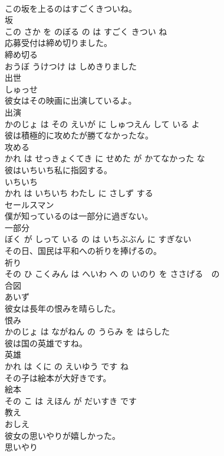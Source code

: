 \documentclass[8pt]{extreport}
\begin{document}
\begin{CJK}{UTF8}{min}
\\	この坂を上るのはすごくきついね。	
\\	坂 
\\	この さか を のぼる の は すごく きつい ね			
\\	応募受付は締め切りました。	
\\	締め切る 
\\	おうぼ うけつけ は しめきりました			
\\	出世	
\\	しゅっせ			
\\	彼女はその映画に出演しているよ。	
\\	出演 
\\	かのじょ は その えいが に しゅつえん して いる よ			
\\	彼は積極的に攻めたが勝てなかったな。	
\\	攻める 
\\	かれ は せっきょくてき に せめた が かてなかった な			
\\	彼はいちいち私に指図する。	
\\	いちいち 
\\	かれ は いちいち わたし に さしず する			
\\	セールスマン	
\\	僕が知っているのは一部分に過ぎない。	
\\	一部分 
\\	ぼく が しって いる の は いちぶぶん に すぎない			
\\	その日、国民は平和への祈りを捧げるの。	
\\	祈り 
\\	その ひ こくみん は へいわ へ の いのり を ささげる　の			
\\	合図	
\\	あいず			
\\	彼女は長年の恨みを晴らした。	
\\	恨み 
\\	かのじょ は ながねん の うらみ を はらした			
\\	彼は国の英雄ですね。	
\\	英雄 
\\	かれ は くに の えいゆう です ね			
\\	その子は絵本が大好きです。	
\\	絵本 
\\	その こ は えほん が だいすき です			
\\	教え	
\\	おしえ			
\\	彼女の思いやりが嬉しかった。	
\\	思いやり 

\end{CJK}
\end{document}
